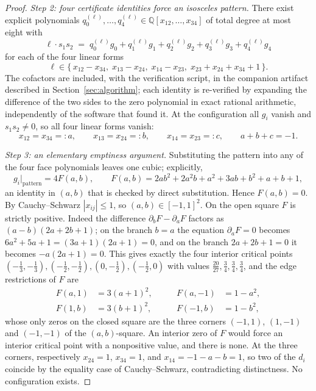 \documentclass[11pt]{amsart}
\theoremstyle{definition}
\begin{document}
\begin{proof}
\emph{Step 2: four certificate identities force an isosceles pattern.}
There exist explicit polynomials
$q_0^{(\ell)},\ldots,q_4^{(\ell)}\in\mathbb Q[x_{12},\ldots,x_{34}]$ of total
degree at most eight with
\[
 \ell\cdot s_1s_2
 \;=\;
 q_0^{(\ell)}g_0+q_1^{(\ell)}g_1+q_2^{(\ell)}g_2+q_3^{(\ell)}g_3
 +q_4^{(\ell)}g_4
\]
for each of the four linear forms
\[
 \ell\in\{\,x_{12}-x_{34},\;x_{13}-x_{24},\;x_{14}-x_{23},\;
          x_{23}+x_{24}+x_{34}+1\,\}.
\]
The cofactors are included, with the verification script, in the companion
artifact described in Section~\ref{sec:algorithm}; each identity is
re-verified by expanding the difference of the two sides to the zero polynomial
in exact rational arithmetic, independently of the software that found it.
At the configuration all
$g_i$ vanish and $s_1s_2\neq0$, so all four linear forms vanish:
\[
 x_{12}=x_{34}=:a,\qquad
 x_{13}=x_{24}=:b,\qquad
 x_{14}=x_{23}=:c,\qquad
 a+b+c=-1 .
\]

\emph{Step 3: an elementary emptiness argument.}
Substituting the pattern into any of the four face polynomials leaves one
cubic; explicitly,
\[
 g_i\big|_{\text{pattern}}=4F(a,b),
 \qquad
 F(a,b)=2ab^2+2a^2b+a^2+3ab+b^2+a+b+1,
\]
an identity in $(a,b)$ that is checked by direct substitution.  Hence
$F(a,b)=0$.  By Cauchy--Schwarz $|x_{ij}|\le1$, so $(a,b)\in[-1,1]^2$.  On
the open square $F$ is strictly positive.  Indeed the difference
$\partial_bF-\partial_aF$ factors as $(a-b)(2a+2b+1)$; on the branch $b=a$
the equation $\partial_aF=0$ becomes $6a^2+5a+1=(3a+1)(2a+1)=0$, and on the
branch $2a+2b+1=0$ it becomes $-a(2a+1)=0$.  This gives exactly the four
interior critical points
$(-\tfrac13,-\tfrac13),(-\tfrac12,-\tfrac12),(0,-\tfrac12),(-\tfrac12,0)$
with values $\tfrac{20}{27},\tfrac34,\tfrac34,\tfrac34$, and the edge
restrictions of $F$ are
\[
\begin{aligned}
 F(a,1)&=3(a+1)^2, &\qquad F(a,-1)&=1-a^2,\\
 F(1,b)&=3(b+1)^2, &\qquad F(-1,b)&=1-b^2,
\end{aligned}
\]
whose only zeros on the closed square are the three corners $(-1,1)$,
$(1,-1)$ and $(-1,-1)$ of the $(a,b)$-square.  An interior zero of $F$ would
force an interior critical point with a nonpositive value, and there is none.
At the three corners, respectively $x_{24}=1$, $x_{34}=1$, and
$x_{14}=-1-a-b=1$, so two of the $d_i$ coincide by the equality case of
Cauchy--Schwarz, contradicting distinctness.  No configuration exists.
\end{proof}
\end{document}
